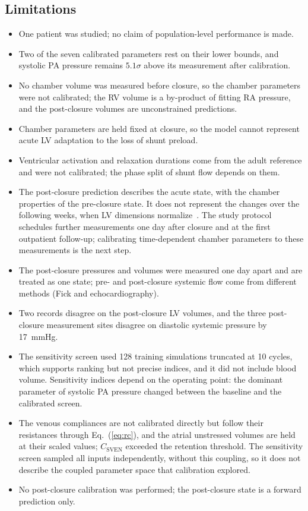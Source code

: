 \documentclass{article}
\begin{document}
\subsection{Limitations}
\begin{itemize}[leftmargin=1.5em]
\item One patient was studied; no claim of population-level performance is made.
\item Two of the seven calibrated parameters rest on their lower bounds, and systolic PA pressure remains $5.1\sigma$ above its measurement after calibration.
\item No chamber volume was measured before closure, so the chamber parameters were not calibrated; the RV volume is a by-product of fitting RA pressure, and the post-closure volumes are unconstrained predictions.
\item Chamber parameters are held fixed at closure, so the model cannot represent acute LV adaptation to the loss of shunt preload.
\item Ventricular activation and relaxation durations come from the adult reference and were not calibrated; the phase split of shunt flow depends on them.
\item The post-closure prediction describes the acute state, with the chamber properties of the pre-closure state. It does not represent the changes over the following weeks, when LV dimensions normalize~\cite{Yuan2025}. The study protocol schedules further measurements one day after closure and at the first outpatient follow-up; calibrating time-dependent chamber parameters to these measurements is the next step.
\item The post-closure pressures and volumes were measured one day apart and are treated as one state; pre- and post-closure systemic flow come from different methods (Fick and echocardiography).
\item Two records disagree on the post-closure LV volumes, and the three post-closure measurement sites disagree on diastolic systemic pressure by 17~mmHg.
\item The sensitivity screen used 128 training simulations truncated at 10 cycles, which supports ranking but not precise indices, and it did not include blood volume. Sensitivity indices depend on the operating point: the dominant parameter of systolic PA pressure changed between the baseline and the calibrated screen.
\item The venous compliances are not calibrated directly but follow their resistances through Eq.~(\ref{eq:rc}), and the atrial unstressed volumes are held at their scaled values; $C_{\mathrm{SVEN}}$ exceeded the retention threshold. The sensitivity screen sampled all inputs independently, without this coupling, so it does not describe the coupled parameter space that calibration explored.
\item No post-closure calibration was performed; the post-closure state is a forward prediction only.
\end{itemize}
\end{document}
